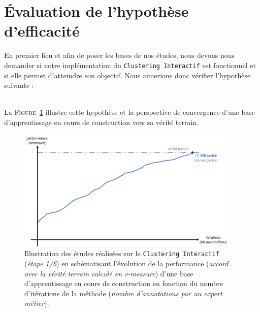 \section{Évaluation de l'hypothèse d'efficacité}
\label{section:4.1-HYPOTHESE-EFFICACITE}

	En premier lieu et afin de poser les bases de nos études, nous devons nous demander si notre implémentation du \texttt{Clustering Interactif} est fonctionnel et si elle permet d'atteindre son objectif.
	Nous aimerions donc vérifier l'hypothèse suivante :
	
	\begin{tcolorbox}[
		title=\faVial~\textbf{Hypothèse d'efficacité}~\faVial,
		colback=colorTcolorboxHypothesis!15,
		colframe=colorTcolorboxHypothesis!75,
		width=\linewidth
	]
		 \\
		
		La \textsc{Figure~\ref{figure:4.1-HYPOTHESE-EFFICACITE}} illustre cette hypothèse et la perspective de convergence d'une base d'apprentissage en cours de construction vers sa vérité terrain.
		\begin{figure}[H]  %
			\centering
			\includegraphics[width=0.95\textwidth]{figures/hypotheses-01-efficacite}
			\caption{
				Illustration des études réalisées sur le \texttt{Clustering Interactif} (\textit{étape 1/6}) en schématisant l'évolution de la performance (\textit{accord avec la vérité terrain calculé en v-measure}) d'une base d'apprentissage en cours de construction en fonction du nombre d'itérations de la méthode (\textit{nombre d'annotations par un expert métier}).
			}
			\label{figure:4.1-HYPOTHESE-EFFICACITE}
		\end{figure}
	\end{tcolorbox}
		

